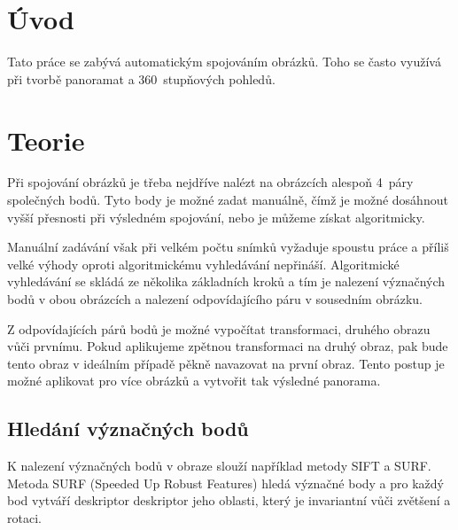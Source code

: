 \documentclass[12pt,a4paper,titlepage,final]{article}
\begin{document}

\def\projname{Počítačové vidění}
\def\projsubname{Skládání snímků}



\pagestyle{plain}
\setcounter{page}{1}
\tableofcontents

\newpage
\pagestyle{plain}
\setcounter{page}{1}

\section{Úvod}

Tato práce se zabývá automatickým spojováním obrázků.
Toho se často využívá při tvorbě panoramat a 360~stupňových pohledů.

\section{Teorie}

Při spojování obrázků je třeba nejdříve nalézt na obrázcích alespoň 4~páry
společných bodů. Tyto body je možné zadat manuálně, čímž je možné dosáhnout
vyšší přesnosti při výsledném spojování, nebo je můžeme získat algoritmicky.

Manuální zadávání však při velkém počtu snímků vyžaduje spoustu práce a příliš
velké výhody oproti algoritmickému vyhledávání nepřináší.
Algoritmické vyhledávání se skládá ze několika základních kroků a tím je nalezení
význačných bodů v obou obrázcích a nalezení odpovídajícího páru v sousedním
obrázku.

Z odpovídajících párů bodů je možné vypočítat transformaci, druhého obrazu vůči
prvnímu. Pokud aplikujeme zpětnou transformaci na druhý obraz, pak bude tento
obraz v ideálním případě pěkně navazovat na první obraz.
Tento postup je možné aplikovat pro více obrázků a vytvořit tak výsledné panorama.

\subsection{Hledání význačných bodů}

K nalezení význačných bodů v obraze slouží například metody SIFT a SURF. 
Metoda SURF (Speeded Up Robust Features) hledá význačné body a pro každý bod
vytváří deskriptor deskriptor jeho oblasti, který je invariantní vůči
zvětšení a rotaci.
\end{document}
